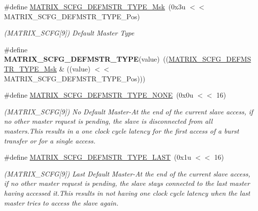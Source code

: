 \begin{DoxyCompactItemize}
\item 
\mbox{\label{group__SAME70__MATRIX_gae095872b0c604d21a97b49e765aa007a}} 
\#define \mbox{\hyperlink{group__SAME70__MATRIX_gae095872b0c604d21a97b49e765aa007a}{M\+A\+T\+R\+I\+X\+\_\+\+S\+C\+F\+G\+\_\+\+D\+E\+F\+M\+S\+T\+R\+\_\+\+T\+Y\+P\+E\+\_\+\+Msk}}~(0x3u $<$$<$ M\+A\+T\+R\+I\+X\+\_\+\+S\+C\+F\+G\+\_\+\+D\+E\+F\+M\+S\+T\+R\+\_\+\+T\+Y\+P\+E\+\_\+\+Pos)
\begin{DoxyCompactList}\small\item\em (M\+A\+T\+R\+I\+X\+\_\+\+S\+C\+FG\mbox{[}9\mbox{]}) Default Master Type \end{DoxyCompactList}\item 
\mbox{\label{group__SAME70__MATRIX_ga985c6bcc1fdaf9a7b2ac870130b36033}} 
\#define {\bfseries M\+A\+T\+R\+I\+X\+\_\+\+S\+C\+F\+G\+\_\+\+D\+E\+F\+M\+S\+T\+R\+\_\+\+T\+Y\+PE}(value)~((\mbox{\hyperlink{group__SAMV71__MATRIX_gae095872b0c604d21a97b49e765aa007a}{M\+A\+T\+R\+I\+X\+\_\+\+S\+C\+F\+G\+\_\+\+D\+E\+F\+M\+S\+T\+R\+\_\+\+T\+Y\+P\+E\+\_\+\+Msk}} \& ((value) $<$$<$ M\+A\+T\+R\+I\+X\+\_\+\+S\+C\+F\+G\+\_\+\+D\+E\+F\+M\+S\+T\+R\+\_\+\+T\+Y\+P\+E\+\_\+\+Pos)))
\item 
\mbox{\label{group__SAME70__MATRIX_gaa6edc1efa8f3fc131a2c48d959df99e4}} 
\#define \mbox{\hyperlink{group__SAME70__MATRIX_gaa6edc1efa8f3fc131a2c48d959df99e4}{M\+A\+T\+R\+I\+X\+\_\+\+S\+C\+F\+G\+\_\+\+D\+E\+F\+M\+S\+T\+R\+\_\+\+T\+Y\+P\+E\+\_\+\+N\+O\+NE}}~(0x0u $<$$<$ 16)
\begin{DoxyCompactList}\small\item\em (M\+A\+T\+R\+I\+X\+\_\+\+S\+C\+FG\mbox{[}9\mbox{]}) No Default Master-\/\+At the end of the current slave access, if no other master request is pending, the slave is disconnected from all masters.\+This results in a one clock cycle latency for the first access of a burst transfer or for a single access. \end{DoxyCompactList}\item 
\mbox{\label{group__SAME70__MATRIX_gab6309467f784a362e9f4909995aa6c95}} 
\#define \mbox{\hyperlink{group__SAME70__MATRIX_gab6309467f784a362e9f4909995aa6c95}{M\+A\+T\+R\+I\+X\+\_\+\+S\+C\+F\+G\+\_\+\+D\+E\+F\+M\+S\+T\+R\+\_\+\+T\+Y\+P\+E\+\_\+\+L\+A\+ST}}~(0x1u $<$$<$ 16)
\begin{DoxyCompactList}\small\item\em (M\+A\+T\+R\+I\+X\+\_\+\+S\+C\+FG\mbox{[}9\mbox{]}) Last Default Master-\/\+At the end of the current slave access, if no other master request is pending, the slave stays connected to the last master having accessed it.\+This results in not having one clock cycle latency when the last master tries to access the slave again. \end{DoxyCompactList}\item 

\end{DoxyCompactItemize}
